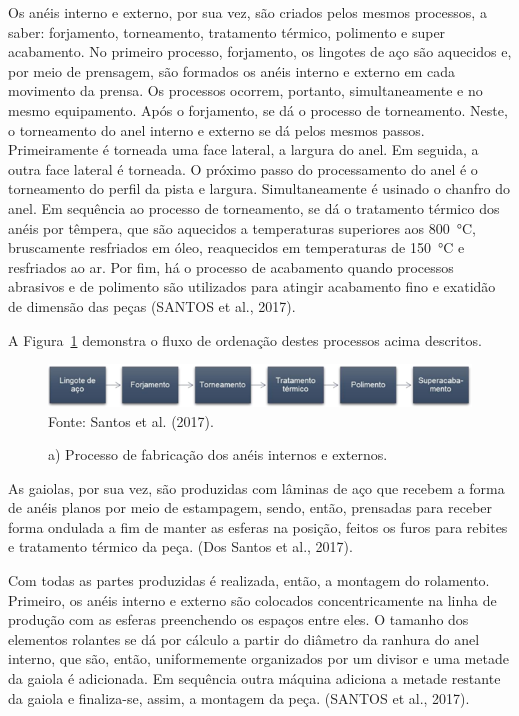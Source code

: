 \documentclass[
	12pt,				
	oneside,			
	a4paper,			
	english,			
	brazil,	
	sumario=abnt-6027-2012		
	]{abntex2ppgsi}
\begin{document}
Os anéis interno e externo, por sua vez, são criados pelos mesmos processos, a saber: forjamento, torneamento, tratamento térmico, polimento e super acabamento. No primeiro processo, forjamento, os lingotes de aço são aquecidos e, por meio de prensagem, são formados os anéis interno e externo em cada movimento da prensa. Os processos ocorrem, portanto, simultaneamente e no mesmo equipamento. Após o forjamento, se dá o processo de torneamento. Neste, o torneamento do anel interno e externo se dá pelos mesmos passos. Primeiramente é torneada uma face lateral, a largura do anel. Em seguida, a outra face lateral é torneada. O próximo passo do processamento do anel é o torneamento do perfil da pista e largura. Simultaneamente é usinado o chanfro do anel. Em sequência ao processo de torneamento, se dá o tratamento térmico dos anéis por têmpera, que são aquecidos a temperaturas superiores aos \SI{800}{\celsius}, bruscamente resfriados em óleo, reaquecidos em temperaturas de \SI{150}{\celsius} e resfriados ao ar. Por fim, há o processo de acabamento quando processos abrasivos e de polimento são utilizados para atingir acabamento fino e exatidão de dimensão das peças (SANTOS et al., 2017). 


A Figura~\ref{FiguraProcessoFabricacao} demonstra o fluxo de ordenação destes processos acima descritos.
\begin{figure}[!htb]
\centering
\caption{a) Processo de fabricação dos anéis internos e externos.}
\includegraphics[width=\textwidth,height=\textheight,keepaspectratio]{Figura2} \\
Fonte: Santos et al. (2017).
\label{FiguraProcessoFabricacao}
\end{figure}

As gaiolas, por sua vez, são produzidas com lâminas de aço que recebem a forma de anéis planos por meio de estampagem, sendo, então, prensadas para receber forma ondulada a fim de manter as esferas na posição, feitos os furos para rebites e tratamento térmico da peça. (Dos Santos et al., 2017).
 
Com todas as partes produzidas é realizada, então, a montagem do rolamento. Primeiro, os anéis interno e externo são colocados concentricamente na linha de produção com as esferas preenchendo os espaços entre eles. O tamanho dos elementos rolantes se dá por cálculo a partir do diâmetro da ranhura do anel interno, que são, então, uniformemente organizados por um divisor e uma metade da gaiola é adicionada. Em sequência outra máquina adiciona a metade restante da gaiola e finaliza-se, assim, a montagem da peça. (SANTOS et al., 2017). 
\end{document}
